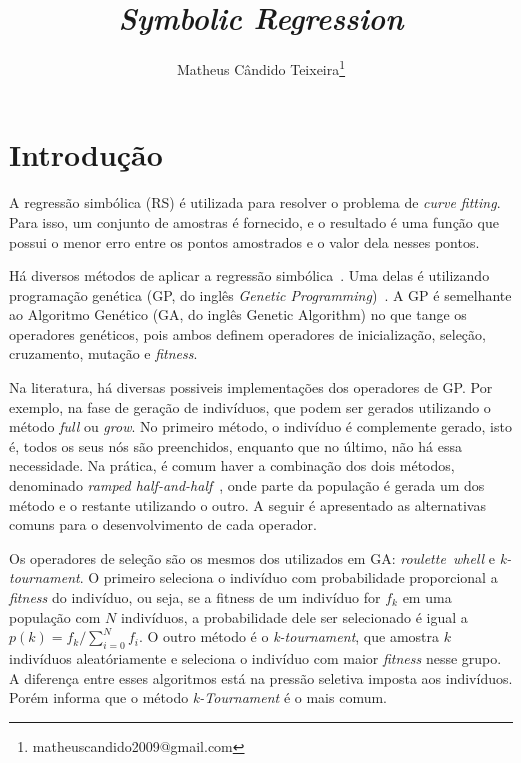 \documentclass[a4paper]{article}
\begin{document}
\title{{\itshape Symbolic Regression}}
\author{Matheus Cândido Teixeira\thanks{matheuscandido2009@gmail.com}}
\maketitle

\section{Introdução}
A regressão simbólica (RS) é utilizada para resolver o problema de \emph{curve
fitting}. Para isso, um conjunto de amostras é fornecido, e o resultado é uma
função que possui o menor erro entre os pontos amostrados e o valor dela nesses
pontos.

Há diversos métodos de aplicar a regressão simbólica~\citep{jin2019}. Uma delas
é utilizando programação genética (GP, do inglês \textit{Genetic
  Programming})~\citep{poli2008}.  A GP é semelhante ao Algoritmo Genético (GA,
do inglês Genetic Algorithm) no que tange os operadores genéticos, pois ambos
definem operadores de inicialização, seleção, cruzamento, mutação e
\textit{fitness}.

Na literatura, há diversas possiveis implementações dos operadores de GP. Por
exemplo, na fase de geração de indivíduos, que podem ser gerados utilizando o
método \textit{full} ou \textit{grow}. No primeiro método, o indivíduo é
complemente gerado, isto é, todos os seus nós são preenchidos, enquanto que no
último, não há essa necessidade. Na prática, é comum haver a combinação dos dois
métodos, denominado \textit{ramped half-and-half}~\citep{poli2008}, onde parte
da população é gerada um dos método e o restante utilizando o outro. A seguir é
apresentado as alternativas comuns para o desenvolvimento de cada operador.

Os operadores de seleção são os mesmos dos utilizados em GA:
\textit{roulette~whell} e \textit{k-tournament}. O primeiro seleciona o
indivíduo com probabilidade proporcional a \textit{fitness} do indivíduo, ou
seja, se a fitness de um indivíduo for \emph{$f_k$} em uma população com $N$
indivíduos, a probabilidade dele ser selecionado é igual a $p(k) =
f_k/\sum_{i=0}^{N}f_i$. O outro método é o \textit{k-tournament}, que amostra
$k$ indivíduos aleatóriamente e seleciona o indivíduo com maior \textit{fitness}
nesse grupo. A diferença entre esses algoritmos está na pressão seletiva imposta
aos indivíduos. Porém \citet{poli2008} informa que o método
\textit{k-Tournament} é o mais comum.
\end{document}
